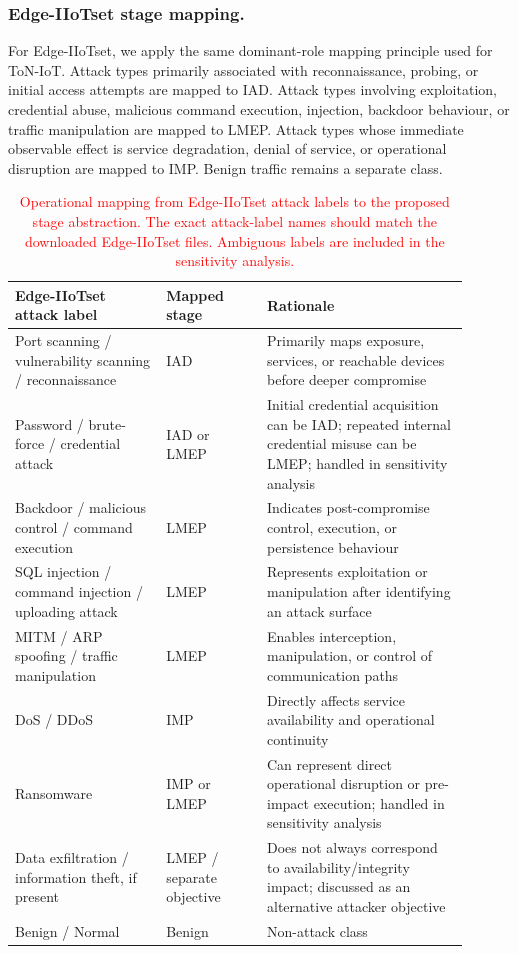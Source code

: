 \documentclass[pdflatex,sn-mathphys-num]{sn-jnl}
\theoremstyle{thmstyleone}%
\theoremstyle{thmstyletwo}%
\theoremstyle{thmstylethree}%
\begin{document}
\color{red}
\subsubsection{Edge-IIoTset stage mapping.}
For Edge-IIoTset, we apply the same dominant-role mapping principle used for ToN-IoT. Attack types primarily associated with reconnaissance, probing, or initial access attempts are mapped to IAD. Attack types involving exploitation, credential abuse, malicious command execution, injection, backdoor behaviour, or traffic manipulation are mapped to LMEP. Attack types whose immediate observable effect is service degradation, denial of service, or operational disruption are mapped to IMP. Benign traffic remains a separate class.

\begin{table}[!t]
\centering
\small
\caption{\textcolor{red}{Operational mapping from Edge-IIoTset attack labels to the proposed stage abstraction. The exact attack-label names should match the downloaded Edge-IIoTset files. Ambiguous labels are included in the sensitivity analysis.}}
\label{tab:edgeiiotset_stage_mapping}
\renewcommand{\arraystretch}{1.12}
\begin{tabular}{p{0.30\linewidth} p{0.20\linewidth} p{0.40\linewidth}}
\toprule
\textbf{Edge-IIoTset attack label} & \textbf{Mapped stage} & \textbf{Rationale} \\
\midrule
Port scanning / vulnerability scanning / reconnaissance & IAD & Primarily maps exposure, services, or reachable devices before deeper compromise \\
Password / brute-force / credential attack & IAD or LMEP & Initial credential acquisition can be IAD; repeated internal credential misuse can be LMEP; handled in sensitivity analysis \\
Backdoor / malicious control / command execution & LMEP & Indicates post-compromise control, execution, or persistence behaviour \\
SQL injection / command injection / uploading attack & LMEP & Represents exploitation or manipulation after identifying an attack surface \\
MITM / ARP spoofing / traffic manipulation & LMEP & Enables interception, manipulation, or control of communication paths \\
DoS / DDoS & IMP & Directly affects service availability and operational continuity \\
Ransomware & IMP or LMEP & Can represent direct operational disruption or pre-impact execution; handled in sensitivity analysis \\
Data exfiltration / information theft, if present & LMEP / separate objective & Does not always correspond to availability/integrity impact; discussed as an alternative attacker objective \\
Benign / Normal & Benign & Non-attack class \\
\bottomrule
\end{tabular}
\end{table}
\end{document}
